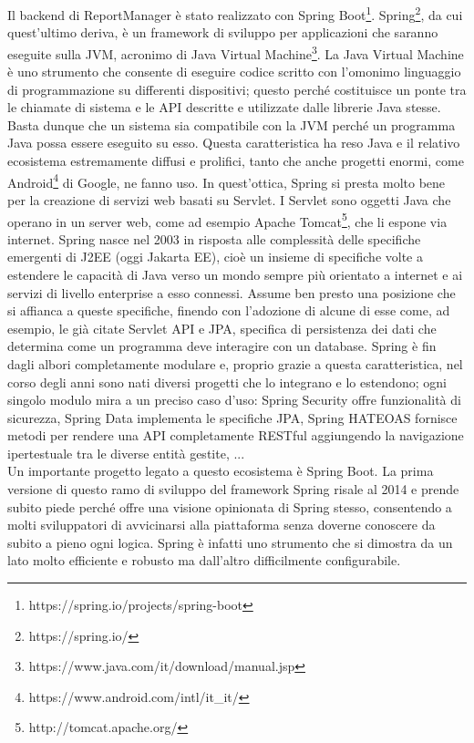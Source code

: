 Il backend di ReportManager è stato realizzato con Spring Boot\footnote{https://spring.io/projects/spring-boot}.
Spring\footnote{https://spring.io/}, da cui quest'ultimo deriva, è un framework di sviluppo per applicazioni che saranno eseguite sulla JVM, 
acronimo di Java Virtual Machine\footnote{https://www.java.com/it/download/manual.jsp}.
La Java Virtual Machine è uno strumento che consente di eseguire codice scritto con l'omonimo linguaggio di programmazione su differenti dispositivi; questo perché costituisce 
un ponte tra le chiamate di sistema e le API descritte e utilizzate dalle librerie Java stesse.
Basta dunque che un sistema sia compatibile con la JVM perché un programma Java possa essere eseguito su esso.
Questa caratteristica ha reso Java e il relativo ecosistema estremamente diffusi e prolifici, tanto che anche progetti enormi, come Android\footnote{https://www.android.com/intl/it\_it/} 
di Google, ne fanno uso.
In quest'ottica, Spring si presta molto bene per la creazione di servizi web basati su Servlet.
I Servlet sono oggetti Java che operano in un server web, come ad esempio Apache Tomcat\footnote{http://tomcat.apache.org/}, che li espone via internet.
Spring nasce nel 2003 in risposta alle complessità delle specifiche emergenti di J2EE (oggi Jakarta EE), cioè un insieme di specifiche volte a estendere le capacità di Java 
verso un mondo sempre più orientato a internet e ai servizi di livello enterprise a esso connessi.
Assume ben presto una posizione che si affianca a queste specifiche, finendo con l'adozione di alcune di esse come, ad esempio, le già citate Servlet API e JPA, specifica di 
persistenza dei dati che determina come un programma deve interagire con un database.
Spring è fin dagli albori completamente modulare e, proprio grazie a questa caratteristica, nel corso degli anni sono nati diversi progetti che lo integrano e lo estendono;
ogni singolo modulo mira a un preciso caso d'uso: Spring Security offre funzionalità di sicurezza, Spring Data implementa le specifiche JPA, Spring HATEOAS fornisce metodi per 
rendere una API completamente RESTful aggiungendo la navigazione ipertestuale tra le diverse entità gestite, ...
\\
Un importante progetto legato a questo ecosistema è Spring Boot.
La prima versione di questo ramo di sviluppo del framework Spring risale al 2014 e prende subito piede perché offre una visione opinionata di Spring stesso, consentendo a molti
sviluppatori di avvicinarsi alla piattaforma senza doverne conoscere da subito a pieno ogni logica.
Spring è infatti uno strumento che si dimostra da un lato molto efficiente e robusto ma dall'altro difficilmente configurabile.
